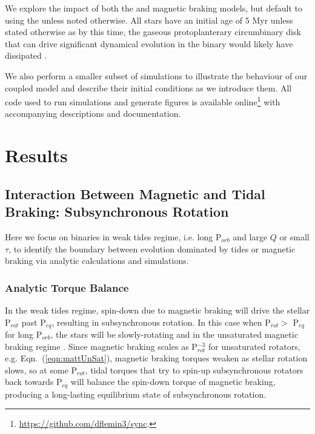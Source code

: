 \documentclass[twocolumn]{aastex61}
\begin{document}
We explore the impact of both the \citet{Matt2015} and \citet{Reiners2012} magnetic braking models, but default to using the \citet{Matt2015} unless noted otherwise. All stars have an initial age of 5 Myr unless stated otherwise as by this time, the gaseous protoplanterary circumbinary disk that can drive significant dynamical evolution in the binary \citep[e.g.][]{Fleming2017} would likely have dissipated \citep{Haisch2001}.

We also perform a smaller subset of simulations to illustrate the behaviour of our coupled model and describe their initial conditions as we introduce them. All code used to run simulations and generate figures is available online\footnote{\href{https://github.com/dflemin3/sync}{https://github.com/dflemin3/sync}.} with accompanying descriptions and documentation.


\section{Results} \label{sec:results}

\subsection{Interaction Between Magnetic and Tidal Braking: Subsynchronous Rotation} \label{sec:eq}

Here we focus on binaries in weak tides regime, i.e. long P$_{orb}$ and large $Q$ or small $\tau$, to identify the boundary between evolution dominated by tides or magnetic braking via analytic calculations and simulations.  

\subsubsection{Analytic Torque Balance} \label{sec:analytic}

In the weak tides regime, spin-down due to magnetic braking will drive the stellar P$_{rot}$ past P$_{eq}$, resulting in subsynchronous rotation. In this case when P$_{rot} >$ P$_{eq}$ for long P$_{orb}$, the stars will be slowly-rotating and in the unsaturated magnetic braking regime \citep{Matt2015}. Since magnetic braking scales as P$_{rot}^{-3}$ for unsaturated rotators, e.g. Eqn.~(\ref{eqn:mattUnSat}), magnetic braking torques weaken as stellar rotation slows, so at some P$_{rot}$, tidal torques that try to spin-up subsynchronous rotators back towards P$_{eq}$ will balance the spin-down torque of magnetic braking, producing a long-lasting equilibrium state of subsynchronous rotation. 
\end{document}
